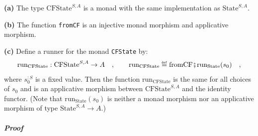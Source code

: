 \textbf{(a)} The type $\text{CFState}^{S,A}$ is a monad with the
same implementation as $\text{State}^{S,A}$.

\textbf{(b)} The function \lstinline!fromCF! is an injective monad
morphism and applicative morphism.

\textbf{(c)} Define a runner for the monad \lstinline!CFState! by:
\[
\text{run}_{\text{CFState}}:\text{CFState}^{S,A}\rightarrow A\quad,\quad\quad\text{run}_{\text{CFState}}\triangleq\text{fromCF}\bef\text{run}_{\text{State}}(s_{0})\quad,
\]
where $s_{0}^{:S}$ is a fixed value. Then the function $\text{run}_{\text{CFState}}$
is the same for all choices of $s_{0}$ and is an applicative morphism
between $\text{CFState}^{S,A}$ and the identity functor. (Note that
$\text{run}_{\text{State}}(s_{0})$ is neither a monad morphism nor
an applicative morphism of type $\text{State}^{S,A}\rightarrow A$.)

\subparagraph{Proof}

